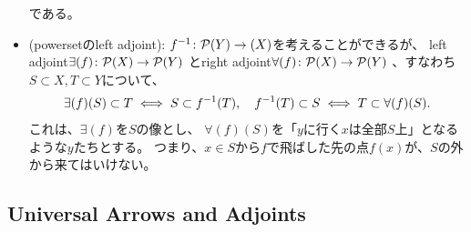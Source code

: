 \documentclass[9pt]{ltjsarticle}
\begin{document}
\begin{itemize}
  である。
  \item (powersetのleft adjoint):
  $f\inv \colon \cal P(Y)\to \cal (X)$を考えることができるが、
  left adjoint$\exists(f)\colon \cal P(X)\to \cal P(Y)$
  とright adjoint$\forall(f)\colon \cal P(X)\to \cal P(Y)$
  、すなわち$S\subset X,T\subset Y$について、
  \begin{align}
    \exists(f)(S) \subset T
    \iff
    S\subset f\inv (T),\quad
    f\inv(T)\subset S
    \iff
    T\subset \forall(f)(S).
  \end{align}
  これは、$\exists(f)$を$S$の像とし、
  $\forall(f)(S)$を「$y$に行く$x$は全部$S$上」となるような$y$たちとする。
  つまり、$x\in S$から$f$で飛ばした先の点$f(x)$が、$S$の外から来てはいけない。
\end{itemize}

\subsection{Universal Arrows and Adjoints}
\label{sub:Universal Arrows and Adjoints}
\end{document}
